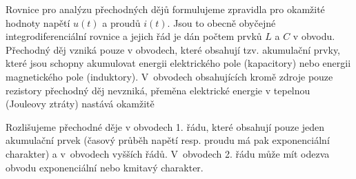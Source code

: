 Rovnice pro analýzu přechodných dějů formulujeme zpravidla pro okamžité hodnoty napětí $u(t)$ a proudů $i(t)$. Jsou to obecně obyčejné integrodiferenciální rovnice a jejich řád je dán počtem prvků $L$ a $C$ v obvodu. Přechodný děj vzniká pouze v obvodech, které obsahují tzv. akumulační prvky, které jsou schopny akumulovat energii elektrického pole (kapacitory) nebo energii magnetického pole (induktory). V~obvodech obsahujících kromě zdroje pouze rezistory přechodný děj nevzniká, přeměna elektrické energie v tepelnou (Jouleovy ztráty) nastává okamžitě

Rozlišujeme přechodné děje v obvodech 1. řádu, které obsahují pouze jeden akumulační prvek (časový průběh napětí resp. proudu má pak exponenciální charakter) a v~obvodech vyšších řádů. V~obvodech 2. řádu může mít odezva obvodu exponenciální nebo kmitavý charakter.